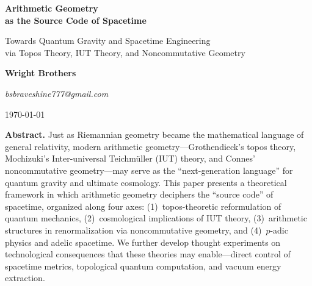 \documentclass[12pt,a4paper]{article}
\theoremstyle{definition}
\begin{document}
\begin{titlepage}
\centering
\vspace*{2cm}

{\LARGE\sffamily\bfseries
Arithmetic Geometry\\[10pt]
as the Source Code of Spacetime
}

\vspace{0.8cm}

{\Large\sffamily
Towards Quantum Gravity and Spacetime Engineering\\
via Topos Theory, IUT Theory, and Noncommutative Geometry
}

\vspace{1.5cm}

{\large\bfseries Wright Brothers}

\vspace{0.3cm}

{\normalsize\itshape bsbraveshine777@gmail.com}

\vspace{1.5cm}

{\large \today}

\vspace{3cm}

\begin{tcolorbox}[colback=deepblue!3, colframe=deepblue!40, width=13cm]
\sffamily\small
\textbf{Abstract.} Just as Riemannian geometry became the mathematical language of general relativity, modern arithmetic geometry---Grothendieck's topos theory, Mochizuki's Inter-universal Teichm\"{u}ller (IUT) theory, and Connes' noncommutative geometry---may serve as the ``next-generation language'' for quantum gravity and ultimate cosmology. This paper presents a theoretical framework in which arithmetic geometry deciphers the ``source code'' of spacetime, organized along four axes: (1)~topos-theoretic reformulation of quantum mechanics, (2)~cosmological implications of IUT theory, (3)~arithmetic structures in renormalization via noncommutative geometry, and (4)~$p$-adic physics and adelic spacetime. We further develop thought experiments on technological consequences that these theories may enable---direct control of spacetime metrics, topological quantum computation, and vacuum energy extraction.
\end{tcolorbox}

\end{titlepage}
\end{document}
